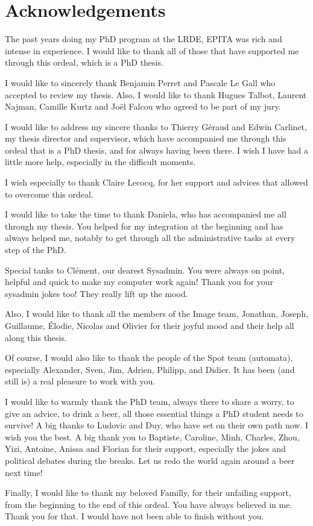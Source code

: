 \section*{Acknowledgements}
\label{sec:acknowledgement}

The past years doing my PhD program at the LRDE, EPITA was rich and intense in experience. I would like to thank all of
those that have supported me through this ordeal, which is a PhD thesis.

I would like to sincerely thank Benjamin Perret and Pascale Le Gall who accepted to review my thesis. Also, I would like
to thank Hugues Talbot, Laurent Najman, Camille Kurtz and Jo\"{e}l Falcou who agreed to be part of my jury.

I would like to address my sincere thanks to Thierry Géraud and Edwin Carlinet, my thesis director and supervisor, which
have accompanied me through this ordeal that is a PhD thesis, and for always having been there. I wish I have had a
little more help, especially in the difficult moments.

I wish especially to thank Claire Lecocq, for her support and advices that allowed to overcome this ordeal.

I would like to take the time to thank Daniela, who has accompanied me all through my thesis. You helped for my
integration at the beginning and has always helped me, notably to get through all the administrative tasks at every
step of the PhD.

Special tanks to Cl\'{e}ment, our dearest Sysadmin. You were always on point, helpful and quick to make my computer work
again! Thank you for your sysadmin jokes too! They really lift up the mood.

Also, I would like to thank all the members of the Image team, Jonathan, Joseph, Guillaume, \'{E}lodie, Nicolas and
Olivier for their joyful mood and their help all along this thesis.

Of course, I would also like to thank the people of the Spot team (automata), especially Alexander, Sven, Jim, Adrien,
Philipp, and Didier. It has been (and still is) a real pleasure to work with you.

I would like to warmly thank the PhD team, always there to share a worry, to give an advice, to drink a beer, all those
essential things a PhD student needs to survive! A big thanks to Ludovic and Duy, who have set on their own path now. I
wish you the best. A big thank you to Baptiste, Caroline, Minh, Charles, Zhou, Yizi, Antoine, Anissa and Florian for
their support, especially the jokes and political debates during the breaks. Let us redo the world again around a beer
next time!

Finally, I would like to thank my beloved Familly, for their unfailing support, from the beginning to the end of this
ordeal. You have always believed in me. Thank you for that. I would have not been able to finish without you.
